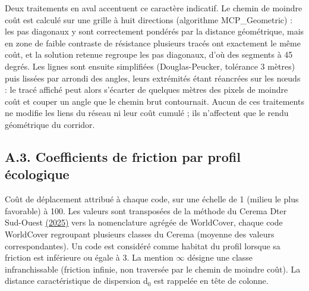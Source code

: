 \documentclass[a4paper,11pt]{report}
\begin{document}
Deux traitements en aval accentuent ce caractère indicatif. Le chemin de moindre coût est calculé sur une grille à huit directions (algorithme MCP\_Geometric) : les pas diagonaux y sont correctement pondérés par la distance géométrique, mais en zone de faible contraste de résistance plusieurs tracés ont exactement le même coût, et la solution retenue regroupe les pas diagonaux, d'où des segments à 45 degrés. Les lignes sont ensuite simplifiées (Douglas-Peucker, tolérance 3 mètres) puis lissées par arrondi des angles, leurs extrémités étant réancrées sur les n\oe{}uds : le tracé affiché peut alors s'écarter de quelques mètres des pixels de moindre coût et couper un angle que le chemin brut contournait. Aucun de ces traitements ne modifie les liens du réseau ni leur coût cumulé ; ils n'affectent que le rendu géométrique du corridor.

\subsection{A.3. Coefficients de friction par profil écologique}

Coût de déplacement attribué à chaque code, sur une échelle de 1 (milieu le plus favorable) à 100. Les valeurs sont transposées de la méthode du Cerema Dter Sud-Ouest \hyperref[sec:bibliographie]{(2025)} vers la nomenclature agrégée de WorldCover, chaque code WorldCover regroupant plusieurs classes du Cerema (moyenne des valeurs correspondantes). Un code est considéré comme habitat du profil lorsque sa friction est inférieure ou égale à 3. La mention $\infty$ désigne une classe infranchissable (friction infinie, non traversée par le chemin de moindre coût). La distance caractéristique de dispersion d$_{0}$ est rappelée en tête de colonne.
\end{document}
